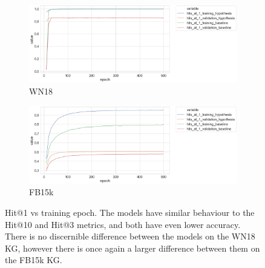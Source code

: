 
\begin{figure}[H]
	\begin{subfigure}[b]{.5\linewidth}
   		\centering
    		\includegraphics[width=1.0\linewidth, height=0.6\linewidth]{WN18_hits_at_1_Results}
		\captionsetup{justification=centering}
		\caption{WN18}
	\end{subfigure}
	\begin{subfigure}[b]{.5\linewidth}
   		\centering
		\includegraphics[width=1.0\linewidth, height=0.6\linewidth]{FB15k_hits_at_1_Results}
		\captionsetup{justification=centering}
		\caption{FB15k}
	\end{subfigure}
	\captionsetup{justification=centering}
	\caption{Hit@1 vs training epoch. The models have similar behaviour to the Hit@10 and Hit@3 metrics, and both have even lower accuracy. There is no discernible difference between the models on the WN18 KG, however there is once again a larger difference between them on the FB15k KG. }
\end{figure}

